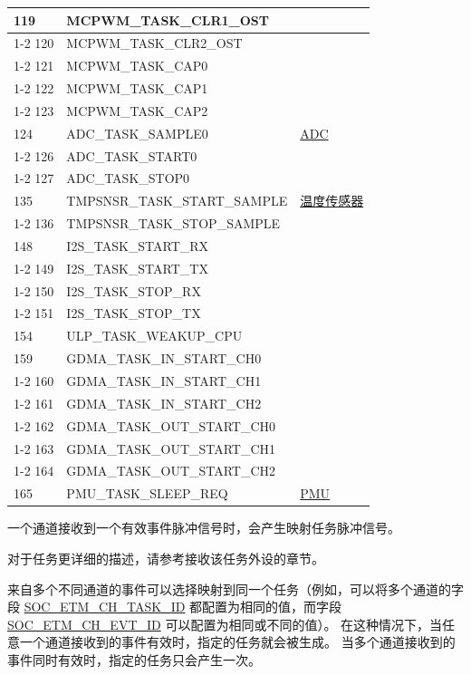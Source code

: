 \documentclass[main\_\_CN.tex]{subfiles}
\begin{document}
\begin{longtable}{ | l | l | l | }
119 & MCPWM\_TASK\_CLR1\_OST & \\ \cline{1-2}
120 & MCPWM\_TASK\_CLR2\_OST & \\ \cline{1-2}
121 & MCPWM\_TASK\_CAP0      & \\ \cline{1-2}
122 & MCPWM\_TASK\_CAP1      & \\ \cline{1-2}
123 & MCPWM\_TASK\_CAP2      & \\ \hline
124 & ADC\_TASK\_SAMPLE0     & \hyperref[mod:sensor]{ADC}   \\ \cline{1-2}
126 & ADC\_TASK\_START0      & \\ \cline{1-2}
127 & ADC\_TASK\_STOP0& \\ \hline
135 & TMPSNSR\_TASK\_START\_SAMPLE  & \hyperref[mod:sensor]{温度传感器}      \\ \cline{1-2}
136 & TMPSNSR\_TASK\_STOP\_SAMPLE   & \\ \hline
148 & I2S\_TASK\_START\_RX   & \nameref{mod:i2s}   \\ \cline{1-2}
149 & I2S\_TASK\_START\_TX   & \\ \cline{1-2}
150 & I2S\_TASK\_STOP\_RX    & \\ \cline{1-2}
151 & I2S\_TASK\_STOP\_TX    & \\ \hline
154 & ULP\_TASK\_WEAKUP\_CPU & \nameref{mod:ulp} \\ \hline
159 & GDMA\_TASK\_IN\_START\_CH0    & \nameref{mod:dma}  \\ \cline{1-2}
160 & GDMA\_TASK\_IN\_START\_CH1    & \\ \cline{1-2}
161 & GDMA\_TASK\_IN\_START\_CH2    & \\ \cline{1-2}
162 & GDMA\_TASK\_OUT\_START\_CH0   & \\ \cline{1-2}
163 & GDMA\_TASK\_OUT\_START\_CH1   & \\ \cline{1-2}
164 & GDMA\_TASK\_OUT\_START\_CH2   & \\ \hline
165 & PMU\_TASK\_SLEEP\_REQ  & \hyperref[mod:lowpowm]{PMU} \\ \hline
\end{longtable}

一个通道接收到一个有效事件脉冲信号时，会产生映射任务脉冲信号。

对于任务更详细的描述，请参考接收该任务外设的章节。

来自多个不同通道的事件可以选择映射到同一个任务（例如，可以将多个通道的字段 \hyperref[fielddesc:SOCETMCH0TASKID]{SOC\_ETM\_CH\_TASK\_ID} 都配置为相同的值，而字段 \hyperref[fielddesc:SOCETMCH0EVTID]{SOC\_ETM\_CH\_EVT\_ID} 可以配置为相同或不同的值）。 在这种情况下，当任意一个通道接收到的事件有效时，指定的任务就会被生成。 当多个通道接收到的事件同时有效时，指定的任务只会产生一次。
\end{document}
